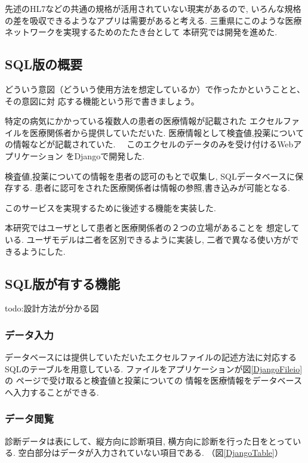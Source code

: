 先述のHL7などの共通の規格が活用されていない現実があるので,
いろんな規格の差を吸収できるようなアプリは需要があると考える.
三重県にこのような医療ネットワークを実現するためのたたき台として
本研究では開発を進めた.
\fi



\subsection{SQL版の概要}
  どういう意図（どういう使用方法を想定しているか）で作ったかということと、その意図に対
  応する機能という形で書きましょう。

  特定の病気にかかっている複数人の患者の医療情報が記載された
  エクセルファイルを医療関係者から提供していただいた.
  医療情報として検査値,投薬についての情報などが記載されていた.
　このエクセルのデータのみを受け付けるWebアプリケーション
  をDjangoで開発した.

  検査値,投薬についての情報を患者の認可のもとで収集し,
  SQLデータベースに保存する.
  患者に認可をされた医療関係者は情報の参照,書き込みが可能となる.

  このサービスを実現するために後述する機能を実装した.

  本研究ではユーザとして患者と医療関係者の２つの立場があることを
  想定している.
  ユーザモデルは二者を区別できるように実装し,
  二者で異なる使い方ができるようにした.



\subsection{SQL版が有する機能}
  todo:設計方法が分かる図

  \subsubsection{データ入力}
    データベースには提供していただいたエクセルファイルの記述方法に対応する
    SQLのテーブルを用意している.
    ファイルをアプリケーションが図\ref{DjangoFileio}の
    ページで受け取ると検査値と投薬についての
    情報を医療情報をデータベースへ入力することができる.

  \subsubsection{データ閲覧}
    診断データは表にして、縦方向に診断項目,
    横方向に診断を行った日をとっている.
    空白部分はデータが入力されていない項目である.
    （図\ref{DjangoTable}）


